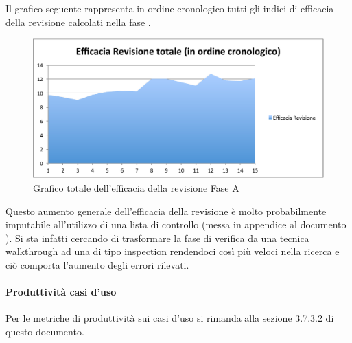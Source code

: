 						Il grafico seguente rappresenta in ordine cronologico tutti gli indici di efficacia della revisione calcolati nella fase .
						\begin{figure}[H]\centering
							\includegraphics[width=12cm]{PianoDiQualifica/Pics/EfficaciaTotaleFaseA.pdf}
							\caption{Grafico totale dell'efficacia della revisione Fase A}
						\end{figure}
						Questo aumento generale dell'efficacia della revisione è molto probabilmente imputabile all'utilizzo di una lista di controllo (messa in appendice al documento ). Si sta infatti cercando di trasformare la fase di verifica da una tecnica walkthrough ad una di tipo inspection rendendoci così più veloci nella ricerca e ciò comporta l'aumento degli errori rilevati.
						
					\paragraph{Produttività casi d'uso}
						Per le metriche di produttività sui casi d'uso si rimanda alla sezione 3.7.3.2 di questo documento.\\
						
						
						 